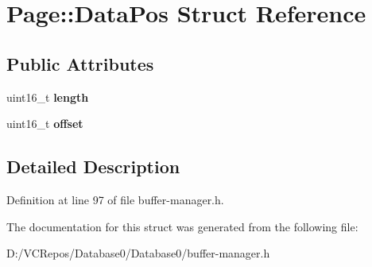 \hypertarget{struct_page_1_1_data_pos}{}\section{Page\+::Data\+Pos Struct Reference}
\label{struct_page_1_1_data_pos}
\subsection*{Public Attributes}
\begin{DoxyCompactItemize}
\item 
\mbox{\label{struct_page_1_1_data_pos_a6c245dba4307135248d4a89c4b18a579}} 
uint16\+\_\+t {\bfseries length}
\item 
\mbox{\label{struct_page_1_1_data_pos_a09a0e4e7628e88bb99185ebaec93ca52}} 
uint16\+\_\+t {\bfseries offset}
\end{DoxyCompactItemize}


\subsection{Detailed Description}


Definition at line 97 of file buffer-\/manager.\+h.



The documentation for this struct was generated from the following file\+:\begin{DoxyCompactItemize}
\item 
D\+:/\+V\+C\+Repos/\+Database0/\+Database0/buffer-\/manager.\+h\end{DoxyCompactItemize}
